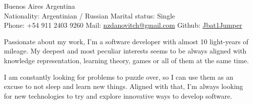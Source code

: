 \documentclass[10pt,a4paper]{article}
\begin{document}
\sloppy



\nobreakvspace{0.3em}

\noindent
Buenos Aires \sbull
Argentina \\
Nationality: Argentinian / Russian \sbull
Marital status: Single \\
Phone: +54 911 2403 9260 \sbull
Mail: \href{mailto:nzdanovitch.at.gmail.dot.com}{nzdanovitch\mbox{}@\mbox{}gmail.com} \sbull
Github: \href{http://github.com/Jbat1Jumper}{Jbat1Jumper}


\spacedhrule{1.2em}{-0.4em}  %





\vspace{-1.3em}
\begin{multicols}{2}
\noindent

Passionate about my work, I'm a software developer with almost 10 light-years
of mileage. My deepest and most peculiar interests seems to be always
aligned with knowledge representation, learning theory, games or all of
them at the same time.

I am constantly looking for problems to puzzle over, so I can use them as an
excuse to not sleep and learn new things. Aligned with that, I'm always
looking for new technologies to try and explore innovative ways to develop
software.



% 
% 


%
%

\end{multicols}


\spacedhrule{0.3em}{-0.4em} %
\end{document}
